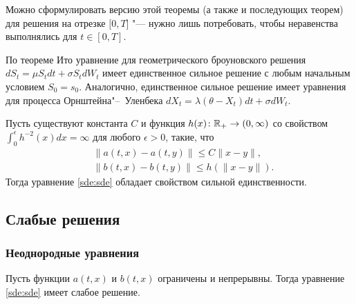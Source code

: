 \begin{remark}
Можно сформулировать версию этой теоремы (а также и последующих теорем) для решения на отрезке $[0,T$] "--- нужно лишь потребовать, чтобы неравенства выполнялись для $t\in[0,T]$.
\end{remark}

\begin{example}
По теореме Ито уравнение для геометрического броуновского решения $d S_t = \mu S_t dt + \sigma S_t dW_t$  имеет единственное сильное решение  с любым начальным условием $S_0=s_0$.
Аналогично, единственное сильное решение имеет уравнения для процесса Орнштейна"--~Уленбека $d X_t = \lambda(\theta- X_t) dt + \sigma dW_t$.
\end{example}

\begin{theorem}
\label{sde:t:yw-2}
Пусть существуют константа $C$ и функция $h(x)\colon \mathbb{R}_+\to(0,\infty)$ со свойством $\int_0^\epsilon h^{-2}(x) dx = \infty$ для любого $\epsilon >0$, такие, что
\begin{align*}
&\|a(t,x) - a(t,y)\| \le C\|x-y\|,\\
&\|b(t,x) - b(t,y)\| \le h(\|x-y\|).
\end{align*}
Тогда уравнение \eqref{sde:sde} обладает свойством сильной единственности.
\end{theorem}



\subsection{Слабые решения}
\subsubsection{Неоднородные уравнения}

\begin{theorem}[А.\,B.~Скороход]
\label{sde:t:skorokhod}
Пусть функции $a(t,x)$ и $b(t,x)$ ограничены и непрерывны.
Тогда уравнение \eqref{sde:sde} имеет слабое решение.
\end{theorem}

